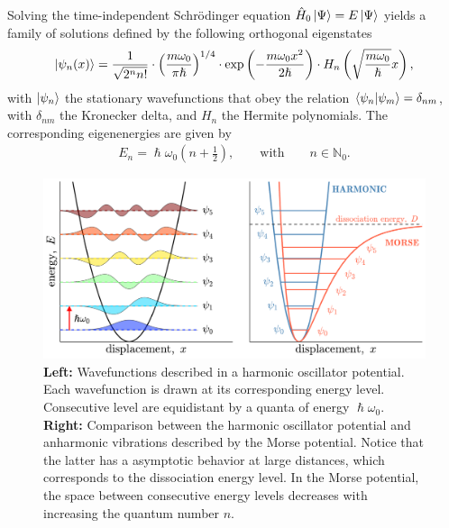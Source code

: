 Solving the time-independent Schr\"odinger equation $\hat{H}_0 \ket{\Psi} = E \ket{\Psi}$ yields a family of solutions defined by the following orthogonal eigenstates 
\begin{eqnarray}
\ket{\psi_n (x)}=\frac{1}{\sqrt{2^{n} n !}} \cdot \left(\frac{m \omega_0}{\pi \hslash}\right)^{1 / 4} \cdot \exp \left(  {-\frac{ m \omega_0 x^{2}}{2 \hslash}}  \right) \cdot H_{n}\left(\sqrt{\frac{m \omega_0}{\hslash}} x \right),
\label{wavefunctions}
\end{eqnarray} 
with $\ket{\psi_{n}}$ the stationary wavefunctions that obey the relation $\braket{\psi_n}{\psi_m} = \delta_{nm}$, with $\delta_{nm}$ the Kronecker delta, and $H_n$ the Hermite polynomials. The corresponding eigenenergies are given by
\begin{eqnarray}
E_n = \hslash \omega_0 \left( n + \frac{1}{2}   \right), \qquad \text{with} \qquad n \in \mathbb{N}_0.
\label{eigenenergy}
\end{eqnarray}
\begin{figure}[t!]
	\centering
	\includegraphics[width=1\figwidth]{chapters/Chapter3_Methods2/Graphs/PotentialHarmonicMorse.pdf} %
	\caption{\textbf{Left:} Wavefunctions described in a harmonic oscillator potential. Each wavefunction is drawn at its corresponding energy level. Consecutive level are equidistant by a quanta of energy $\hslash \omega_0$. \textbf{Right:} Comparison between the harmonic oscillator potential and anharmonic vibrations described by the Morse potential. Notice that the latter has a asymptotic behavior at large distances, which corresponds to the dissociation energy level. In the Morse potential, the space between consecutive energy levels decreases with increasing the quantum number $n$.}
	\label{PotentialsWaveFunctions}
\end{figure}


